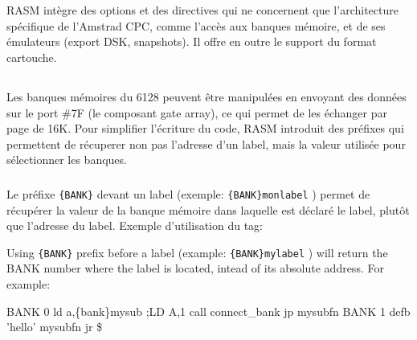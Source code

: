 \section{}

\begin{xfr}
RASM intègre des options et des directives qui ne concernent que l'architecture spécifique de l'Amstrad CPC, comme l'accès aux banques mémoire, et de ses émulateurs (export DSK, snapshots). Il offre en outre le support du format cartouche.
\end{xfr}

\subsection{}

\begin{xfr}
Les banques mémoires du 6128 peuvent être manipulées en envoyant des données sur le port \#7F (le composant gate array), ce qui permet de les échanger par page de 16K. Pour simplifier l'écriture du code, RASM introduit des préfixes qui permettent de récuperer non pas l'adresse d'un label, mais la valeur utilisée pour sélectionner les banques.
\end{xfr}

\subsubsection{}\label{PBANK}

\begin{xfr}
Le préfixe \texttt{\{BANK\}} devant un label (exemple: \texttt{\{BANK\}monlabel} ) permet de récupérer la valeur de la banque mémoire dans laquelle est déclaré le label, plutôt que l'adresse du label.
Exemple d'utilisation du tag:
\end{xfr}

\begin{xen}
Using \texttt{\{BANK\}} prefix before a label (example: \texttt{\{BANK\}mylabel} ) will return the BANK number where the label is located, intead of its absolute address. For example:
\end{xen}

\begin{code}
BANK 0
  ld a,\{bank\}mysub 	;LD A,1
  call connect\_bank
  jp mysubfn
\medskip
BANK 1
  defb 'hello'
mysubfn
  jr \$
\end{code}

